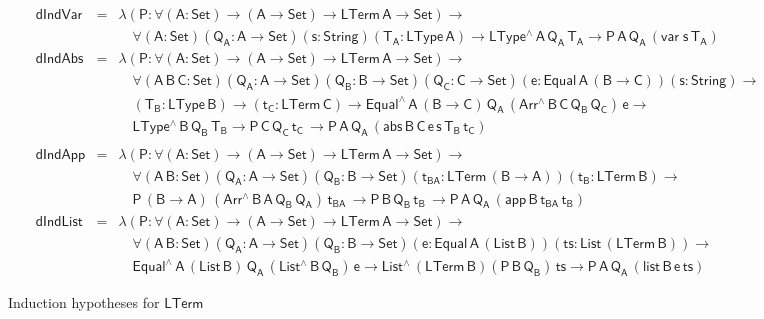 \documentclass[sigplan,10pt]{acmart}
\begin{document}
\begin{figure*}[t]
\begin{adjustbox}{varwidth=7.3in, max width=7.1in, margin=-0.0in 0in
      -0.2in 0in, fbox, center}
{\small
\[\begin{array}{lll}
\mathsf{dIndVar} & = & \mathsf{\lambda (P : \forall (A : Set) \to (A \to Set) \to
  LTerm\,A  \to Set) \to}\\
& &   \quad\mathsf{\forall (A : Set) (Q_A : A \to Set) (s : String) (T_A :
  LType\, A) \to LType^{\wedge} \, A\, Q_A\, T_A \to P \, A\, Q_A\,
 (var \; s\, T_A)}\\[1ex]
\mathsf{dIndAbs} & = & \mathsf{\lambda (P : \forall (A : Set) \to (A \to Set) \to
  LTerm\,A \to Set) \to} \\ 
& &   \quad\mathsf{
  \forall (A\,B\,C: Set) (Q_A : A \to Set)  (Q_B : B \to Set) (Q_C : C
  \to Set) (e : Equal\, A\, (B \to C)) (s : String) \to } \\ 
& &   \quad\mathsf{(T_B : LType\, B) \to (t_C : LTerm\, C)
  \to Equal^{\wedge}\,A\,(B \to C)\, Q_A \, (Arr^{\wedge} \, B\, C\,
  Q_B \, Q_C) \, e \to  } \\
& &   \quad\mathsf{
  LType^{\wedge}\, B\, Q_B\, T_B
  \to P\, C\, Q_C\, t_C\, 
  \to P \, A\, Q_A\, (abs \,B \,C \, e \,s \,T_B \, t_C)}\\
 \\
\mathsf{dIndApp} & = &  \mathsf{\lambda (P : \forall (A : Set) \to (A \to Set) \to LTerm\,A
    \to Set)\to} \\ 
& &  \quad \mathsf{
  \forall (A \,B : Set) (Q_A : A \to Set)  (Q_B : B \to Set) 
   (t_{BA} : LTerm\, (B \to A)) (t_B : LTerm\, B) \to} \\
& &   \quad \mathsf{
  P\, (B \to A)\, (Arr^{\wedge} \, B\, A\, Q_B \, Q_A) \, t_{BA} \, 
  \to P\, B\, Q_B\, t_B\, 
  \to P \, A\, Q_A\, (app \,B \,t_{BA} \, t_B) }\\[1ex]
\mathsf{dIndList} & = &   \mathsf{\lambda (P : \forall (A : Set) \to (A \to Set) \to LTerm\,A
    \to Set) \to} \\ 
& &   \quad \mathsf{
  \forall (A \,B : Set) (Q_A : A \to Set)  (Q_B : B \to Set) 
    (e : Equal\, A\, (List\, B)) (ts : List\, (LTerm\, B)) \to} \\ 
& &   \quad \mathsf{
    Equal^{\wedge}\, A\, (List\,B)\, Q_A\, (List^{\wedge}\, B\, Q_B)\, e 
  \to List^{\wedge}\, (LTerm\,B) (P\, B\, Q_B)\, ts
  \to P \, A\, Q_A\, (list \,B \,e \, ts) }
\end{array}\]}

\vspace*{-0.1in}

\caption{Induction hypotheses for $\mathsf{LTerm}$}\label{fig:ind-hyps-lterm}
\end{adjustbox}
\end{figure*}
\end{document}
